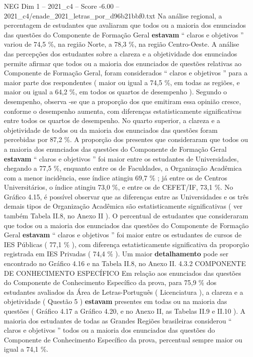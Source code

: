 \begin{textsample}{NEG Dim 1 – 2021\_c4 – Score -6.00 – 2021\_c4/enade\_2021\_letras\_por\_d96b21bbf0.txt}
Na análise regional, a percentagem de estudantes que avaliaram que todos ou a maioria dos enunciados das questões do Componente de Formação Geral \textbf{estavam} “ claros e objetivos ” variou de 74,5 \%, na região Norte, a 78,3 \%, na região Centro-Oeste.
A análise das percepções dos estudantes sobre a clareza e a objetividade dos enunciados permite afirmar que todos ou a maioria dos enunciados de questões relativas ao Componente de Formação Geral, foram considerados “ claros e objetivos ” para a maior parte dos respondentes ( maior ou igual a 74,5 \%, em todas as regiões, e maior ou igual a 64,2 \%, em todos os quartos de desempenho ).
Segundo o desempenho, observa -se que a proporção dos que emitiram essa opinião cresce, conforme o desempenho aumenta, com diferenças estatisticamente significativas entre todos os quartos de desempenho.
No quarto superior, a clareza e a objetividade de todos ou da maioria dos enunciados das questões foram percebidas por 87,2 \%.
A proporção dos presentes que consideraram que todos ou a maioria dos enunciados das questões do Componente de Formação Geral \textbf{estavam} “ claros e objetivos ” foi maior entre os estudantes de Universidades, chegando a 77,5 \%, enquanto entre os de Faculdades, a Organização Acadêmica com a menor incidência, esse índice atingiu 69,7 \% ; já entre os de Centros Universitários, o índice atingiu 73,0 \%, e entre os de CEFET/IF, 73,1 \%.
No Gráfico 4.15, é possível observar que as diferenças entre as Universidades e os três demais tipos de Organização Acadêmica são estatisticamente significativas ( ver também Tabela II.8, no Anexo II ).
O percentual de estudantes que consideraram que todos ou a maioria dos enunciados das questões do Componente de Formação Geral \textbf{estavam} “ claros e objetivos ” foi maior entre os estudantes de cursos de IES Públicas ( 77,1 \% ), com diferença estatisticamente significativa da proporção registrada em IES Privadas ( 74,4 \% ).
Um maior \textbf{detalhamento} pode ser encontrado no Gráfico 4.16 e na Tabela II.8, no Anexo II. 4.3.2 COMPONENTE DE CONHECIMENTO ESPECÍFICO Em relação aos enunciados das questões do Componente de Conhecimento Específico da prova, para 75,9 \% dos estudantes avaliados da Área de Letras-Português ( Licenciatura ), a clareza e a objetividade ( Questão 5 ) \textbf{estavam} presentes em todas ou na maioria das questões ( Gráfico 4.17 a Gráfico 4.20, e no Anexo II, as Tabelas II.9 e II.10 ).
A maioria dos estudantes de todas as Grandes Regiões brasileiras considerou “ claros e objetivos ” todos ou a maioria dos enunciados das questões do Componente de Conhecimento Específico da prova, percentual sempre maior ou igual a 74,1 \%.

\end{textsample}
